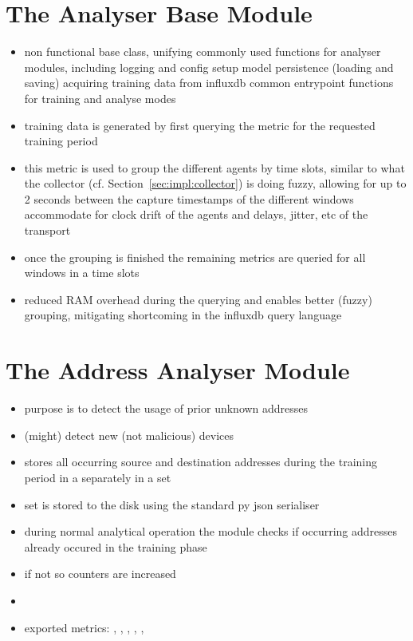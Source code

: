 \section{The Analyser Base Module}
\label{sec:impl:base}

\begin{itemize}
	\item non functional base class, unifying commonly used functions for analyser modules, including
		\subitem logging and config setup
		\subitem model persistence (loading and saving)
		\subitem acquiring training data from \gls{influxdb}
		\subitem common entrypoint functions for training and analyse modes
	\item training data is generated by first querying the  metric for the requested training period
	\item this metric is used to group the different agents by time slots, similar to what the collector (cf. Section~\ref{sec:impl:collector}) is doing
		\subitem fuzzy, allowing for up to 2 seconds between the capture timestamps of the different windows
		\subitem accommodate for clock drift of the agents and delays, jitter, etc of the transport
	\item once the grouping is finished the remaining metrics are queried for all windows in a time slots
	\item reduced RAM overhead during the querying and enables better (fuzzy) grouping, mitigating shortcoming in the \gls{influxdb} query language
\end{itemize}

\section{The Address Analyser Module}
\label{sec:impl:addr}

\begin{itemize}
	\item purpose is to detect the usage of prior unknown addresses
	\item (might) detect new (not malicious) devices
	\item stores all occurring source and destination addresses during the training period in a separately in a set
	\item set is stored to the disk using the standard \gls{py} \gls{json} serialiser
	\item during normal analytical operation the module checks if occurring addresses already occured in the training phase
	\item if not so counters are increased
	\item {}
	\item exported metrics: , , , , , 
\end{itemize}

